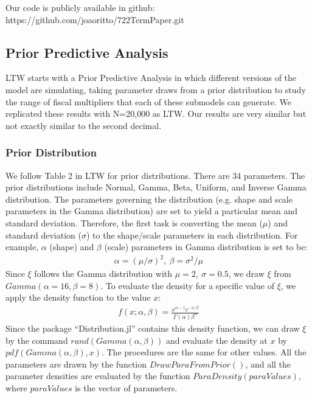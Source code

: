 \documentclass[letterpaper,12pt]{article}%
\begin{document}
Our code is publicly available in github: https://github.com/joaoritto/722TermPaper.git

\subsection{Prior Predictive Analysis}

LTW starts with a Prior Predictive Analysis in which different versions of the model are simulating, taking parameter draws from a prior distribution to study the range of fiscal multipliers that each of these submodels can generate. We replicated these results with N=20,000 as LTW. Our results are very similar but not exactly similar to the second decimal.

\subsubsection*{Prior Distribution}
We follow Table 2 in LTW for prior distributions. There are 34 parameters. The prior distributions include Normal, Gamma, Beta, Uniform, and Inverse Gamma distribution. The parameters  governing the distribution (e.g. shape and scale parameters in the Gamma distribution) are set to yield a particular mean and standard deviation. Therefore, the first task is converting the mean ($\mu$) and standard deviation ($\sigma$) to the shape/scale parameters in each distribution. For example, $\alpha$ (shape) and $\beta$ (scale) parameters in Gamma distribution is set to be:
\begin{align*}
\alpha = \left( \mu/\sigma  \right)^2, \ \beta = \sigma^2/\mu 
\end{align*}
Since $\xi$ follows the Gamma distribution with $\mu=2, \ \sigma=0.5$, we draw $\xi$ from $Gamma(\alpha=16, \beta=8)$. To evaluate the density for a specific value of $\xi$, we apply the density function to the value $x$:
\begin{align*}
f(x; \alpha, \beta) = \frac{x^{\alpha-1}  e^{-x/\beta }}{\Gamma(\alpha) \beta^\alpha}
\end{align*}
Since the package ``Distribution.jl'' contains this density function, we can draw $\xi$ by the command $rand(Gamma(\alpha,\beta))$ and evaluate the density at $x$ by $pdf(Gamma(\alpha,\beta), x )$. The procedures are the same for other values. All the parameters are drawn by the function $DrawParaFromPrior( )$, and all the parameter densities are evaluated by the function $ParaDensity(paraValues )$, where $paraValues$ is the vector of parameters.
\end{document}
